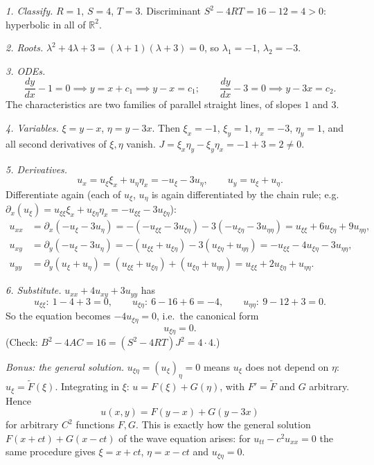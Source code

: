 \documentclass[11pt]{article}
\theoremstyle{plain}
\theoremstyle{definition}
\theoremstyle{remark}
\begin{document}
\emph{1. Classify.} $R = 1$, $S = 4$, $T = 3$. Discriminant $S^2 - 4RT = 16 - 12 = 4 > 0$: hyperbolic in all of $\mathbb{R}^2$.

\emph{2. Roots.} $\lambda^2 + 4\lambda + 3 = (\lambda + 1)(\lambda + 3) = 0$, so $\lambda_1 = -1$, $\lambda_2 = -3$.

\emph{3. ODEs.}
$$ \frac{dy}{dx} - 1 = 0 \implies y = x + c_1 \implies y - x = c_1; \qquad \frac{dy}{dx} - 3 = 0 \implies y - 3x = c_2. $$
The characteristics are two families of parallel straight lines, of slopes $1$ and $3$.

\emph{4. Variables.} $\xi = y - x$, $\eta = y - 3x$. Then $\xi_x = -1$, $\xi_y = 1$, $\eta_x = -3$, $\eta_y = 1$, and all second derivatives of $\xi,\eta$ vanish. $J = \xi_x\eta_y - \xi_y\eta_x = -1 + 3 = 2 \ne 0$.

\emph{5. Derivatives.}
$$ u_x = u_\xi\xi_x + u_\eta\eta_x = -u_\xi - 3u_\eta, \qquad u_y = u_\xi + u_\eta. $$
Differentiate again (each of $u_\xi$, $u_\eta$ is again differentiated by the chain rule; e.g.\ $\partial_x(u_\xi) = u_{\xi\xi}\xi_x + u_{\xi\eta}\eta_x = -u_{\xi\xi} - 3u_{\xi\eta}$):
\begin{align*}
u_{xx} &= \partial_x(-u_\xi - 3u_\eta) = -(-u_{\xi\xi} - 3u_{\xi\eta}) - 3(-u_{\xi\eta} - 3u_{\eta\eta}) = u_{\xi\xi} + 6u_{\xi\eta} + 9u_{\eta\eta}, \\
u_{xy} &= \partial_y(-u_\xi - 3u_\eta) = -(u_{\xi\xi} + u_{\xi\eta}) - 3(u_{\xi\eta} + u_{\eta\eta}) = -u_{\xi\xi} - 4u_{\xi\eta} - 3u_{\eta\eta}, \\
u_{yy} &= \partial_y(u_\xi + u_\eta) = (u_{\xi\xi} + u_{\xi\eta}) + (u_{\xi\eta} + u_{\eta\eta}) = u_{\xi\xi} + 2u_{\xi\eta} + u_{\eta\eta}.
\end{align*}

\emph{6. Substitute.} $u_{xx} + 4u_{xy} + 3u_{yy}$ has
$$ u_{\xi\xi}: \ 1 - 4 + 3 = 0, \qquad u_{\xi\eta}: \ 6 - 16 + 6 = -4, \qquad u_{\eta\eta}: \ 9 - 12 + 3 = 0. $$
So the equation becomes $-4u_{\xi\eta} = 0$, i.e.\ the canonical form
$$ u_{\xi\eta} = 0. $$
(Check: $B^2 - 4AC = 16 = (S^2 - 4RT)J^2 = 4\cdot 4$.)

\emph{Bonus: the general solution.} $u_{\xi\eta} = (u_\xi)_\eta = 0$ means $u_\xi$ does not depend on $\eta$: $u_\xi = \tilde F(\xi)$. Integrating in $\xi$: $u = F(\xi) + G(\eta)$, with $F' = \tilde F$ and $G$ arbitrary. Hence
$$ u(x,y) = F(y - x) + G(y - 3x) $$
for arbitrary $C^2$ functions $F, G$. This is exactly how the general solution $F(x + ct) + G(x - ct)$ of the wave equation arises: for $u_{tt} - c^2u_{xx} = 0$ the same procedure gives $\xi = x + ct$, $\eta = x - ct$ and $u_{\xi\eta} = 0$.
\end{document}
